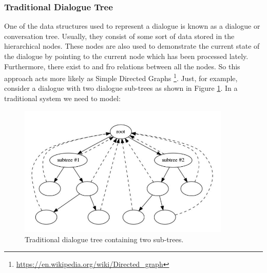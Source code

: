 \subsubsection*{Traditional Dialogue Tree}
One of the data structures used to represent a dialogue is known as a dialogue or conversation tree. Usually, they consist of some sort of data stored in the hierarchical nodes. These nodes are also used to demonstrate the current state of the dialogue by pointing to the current node which has been processed lately. Furthermore, there exist to and fro relations between all the nodes. So this approach acts more likely as Simple Directed Graphs \footnote{\url{https://en.wikipedia.org/wiki/Directed\_graph}}. Just, for example, consider a dialogue with two dialogue sub-trees as shown in Figure \ref{fig:modArch}. In a traditional system we need to model:

\begin{figure}[!h]
    \centering
    \includegraphics[width=0.9\textwidth]{img/Modular_Architecture.PNG}
    \caption{Traditional dialogue tree containing two sub-trees.}
    \label{fig:modArch}
\end{figure}


